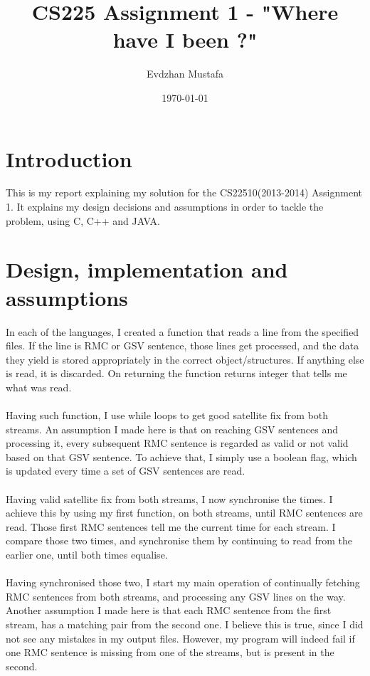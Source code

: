 \documentclass[a4paper]{article}
\title{ CS225 Assignment 1 - "Where have I been ?"   }
\author{Evdzhan Mustafa}
\date{\today}
\begin{document}
\maketitle

\section{Introduction}
This is my report explaining my solution for the CS22510(2013-2014) Assignment 1.  It explains my design decisions and assumptions in order to tackle the problem, using C, C++ and JAVA.
\section{Design, implementation and assumptions}
In each of the languages, I created a function that reads a line from the specified files. If the line is RMC or GSV sentence, those lines get processed, and the data they yield is stored appropriately in the correct object/structures. If anything else is read, it is discarded. On returning the function returns integer that tells me what was read.  \\\\Having such function, I use while loops to get good satellite fix from both streams. An assumption I made here is that on reaching GSV sentences and processing it, every subsequent RMC sentence is regarded as valid or not valid based on that GSV sentence. To achieve that, I simply use a boolean flag, which is updated every time a set of GSV sentences are read. \\\\Having valid satellite fix from both streams, I now synchronise the times. I achieve this by using my first function, on both streams, until RMC sentences are read. Those first RMC sentences tell me the current time for each stream. I compare those two times, and synchronise them by continuing to read from the earlier one, until both times equalise. \\\\
Having synchronised those two, I start my main operation of continually fetching RMC sentences from both streams, and processing any GSV lines on the way. Another assumption I made here is that each RMC sentence from the first stream, has a matching pair from the second one. I believe this is true, since I did not see any mistakes in my output files. However, my program will indeed fail if one RMC sentence is missing from one of the streams, but is present in the second. \\
\end{document}
